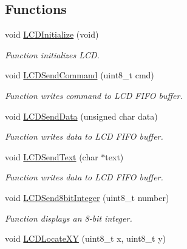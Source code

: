 \subsection*{Functions}
\begin{DoxyCompactItemize}
\item 
void \mbox{\hyperlink{group___l_c_d_h_d44780_non_blocking_gaccb0e33375f99c7ce3eea8e32781c1ba_gaccb0e33375f99c7ce3eea8e32781c1ba}{L\+C\+D\+Initialize}} (void)
\begin{DoxyCompactList}\small\item\em Function initializes L\+CD. \end{DoxyCompactList}\item 
void \mbox{\hyperlink{group___l_c_d_h_d44780_non_blocking_ga73568e70866ca81b92b34ce8a65a01e4_ga73568e70866ca81b92b34ce8a65a01e4}{L\+C\+D\+Send\+Command}} (uint8\+\_\+t cmd)
\begin{DoxyCompactList}\small\item\em Function writes command to L\+CD F\+I\+FO buffer. \end{DoxyCompactList}\item 
void \mbox{\hyperlink{group___l_c_d_h_d44780_non_blocking_gacbe0b84f31cf18df2b70d509e826db3e_gacbe0b84f31cf18df2b70d509e826db3e}{L\+C\+D\+Send\+Data}} (unsigned char data)
\begin{DoxyCompactList}\small\item\em Function writes data to L\+CD F\+I\+FO buffer. \end{DoxyCompactList}\item 
void \mbox{\hyperlink{group___l_c_d_h_d44780_non_blocking_ga198c4cf7d792789662bfa896f5066bb6_ga198c4cf7d792789662bfa896f5066bb6}{L\+C\+D\+Send\+Text}} (char $\ast$text)
\begin{DoxyCompactList}\small\item\em Function writes data to L\+CD F\+I\+FO buffer. \end{DoxyCompactList}\item 
void \mbox{\hyperlink{group___l_c_d_h_d44780_non_blocking_gaf43a1b2f3c74fb30ccf5516f8d0953c5_gaf43a1b2f3c74fb30ccf5516f8d0953c5}{L\+C\+D\+Send8bit\+Integer}} (uint8\+\_\+t number)
\begin{DoxyCompactList}\small\item\em Function displays an 8-\/bit integer. \end{DoxyCompactList}\item 
void \mbox{\hyperlink{group___l_c_d_h_d44780_non_blocking_ga283ac55110a61e344f8a7cbd5b976399_ga283ac55110a61e344f8a7cbd5b976399}{L\+C\+D\+Locate\+XY}} (uint8\+\_\+t x, uint8\+\_\+t y)

\end{DoxyCompactItemize}
